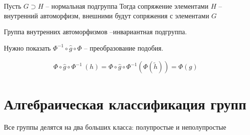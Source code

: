 \documentclass[10pt,a4paper]{article}
\begin{document}
	Пусть $G \supset H$ -- нормальная подгруппа Тогда сопряжение элементами $H$
	-- внутренний автоморфизм, внешними будут сопряжения с элементами $G$
	
	Группа внутренних автоморфизмов --инвариантная подгруппа.
	
	Нужно показать $\Phi^{-1}\circ \hat{g}\circ \Phi$ -- преобразование подобия.
	
	\begin{eqnarray}
		\Phi\circ \hat{g}\circ \Phi^{-1}\ \left(h\right) = 
		\Phi\circ \hat{g} \circ \Phi^{-1}\left(\Phi\left(\widetilde{h}
		\right)\right) = \Phi\left(g\right)
	\end{eqnarray}
	
	\section{Алгебраическая классификация групп}
	
	Все группы делятся на два больших класса: полупростые и неполупростые
\end{document}
